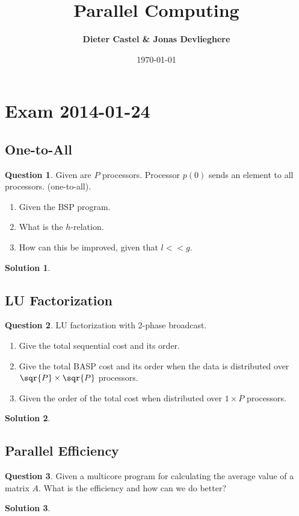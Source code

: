 \documentclass[a4paper, 10pt, oneside]{article}
\title{Parallel Computing}
\date{\today}
\author{\textbf{Dieter Castel \& Jonas Devlieghere}}
\theoremstyle{definition}
\newtheorem*{question}{Question}
\newtheorem*{solution}{Solution}
\begin{document}
\maketitle
\newpage

\tableofcontents
\newpage

\section{Exam 2014-01-24}

\subsection{One-to-All}
\begin{question}
Given are $P$ processors. Processor $p(0)$ sends an element to all processors. (one-to-all).
\begin{enumerate}
	\item Given the BSP program.
	\item What is the $h$-relation.
	\item How can this be improved, given that $l << g$.
\end{enumerate}
\end{question}
\begin{solution}
\end{solution}

\subsection{LU Factorization}
\begin{question}
LU factorization with 2-phase broadcast.
\begin{enumerate}
	\item Give the total sequential cost and its order.
	\item Give the total BASP cost and its order when the data is distributed over $\sqr{P} \times \sqr{P}$ processors.
	\item Given the order of the total cost when distributed over $1 \times P$ processors.
\end{enumerate}
\end{question}
\begin{solution}
\end{solution}

\subsection{Parallel Efficiency}
\begin{question}
Given a multicore program for calculating the average value of a matrix $A$. What is the efficiency and how can we do better?
\end{question}
\begin{solution}
\end{solution}
\end{document}
